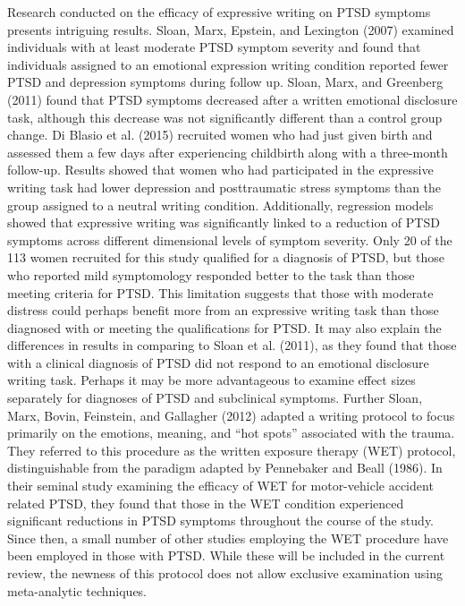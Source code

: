 \documentclass[man, mask]{apa6}
\theoremstyle{definition}
\theoremstyle{definition}
\theoremstyle{definition}
\theoremstyle{remark}
\begin{document}
Research conducted on the efficacy of expressive writing on PTSD
symptoms presents intriguing results. Sloan, Marx, Epstein, and
Lexington (2007) examined individuals with at least moderate PTSD
symptom severity and found that individuals assigned to an emotional
expression writing condition reported fewer PTSD and depression symptoms
during follow up. Sloan, Marx, and Greenberg (2011) found that PTSD
symptoms decreased after a written emotional disclosure task, although
this decrease was not significantly different than a control group
change. Di Blasio et al. (2015) recruited women who had just given birth
and assessed them a few days after experiencing childbirth along with a
three-month follow-up. Results showed that women who had participated in
the expressive writing task had lower depression and posttraumatic
stress symptoms than the group assigned to a neutral writing condition.
Additionally, regression models showed that expressive writing was
significantly linked to a reduction of PTSD symptoms across different
dimensional levels of symptom severity. Only 20 of the 113 women
recruited for this study qualified for a diagnosis of PTSD, but those
who reported mild symptomology responded better to the task than those
meeting criteria for PTSD. This limitation suggests that those with
moderate distress could perhaps benefit more from an expressive writing
task than those diagnosed with or meeting the qualifications for PTSD.
It may also explain the differences in results in comparing to Sloan et
al. (2011), as they found that those with a clinical diagnosis of PTSD
did not respond to an emotional disclosure writing task. Perhaps it may
be more advantageous to examine effect sizes separately for diagnoses of
PTSD and subclinical symptoms. Further Sloan, Marx, Bovin, Feinstein,
and Gallagher (2012) adapted a writing protocol to focus primarily on
the emotions, meaning, and \enquote{hot spots} associated with the
trauma. They referred to this procedure as the written exposure therapy
(WET) protocol, distinguishable from the paradigm adapted by Pennebaker
and Beall (1986). In their seminal study examining the efficacy of WET
for motor-vehicle accident related PTSD, they found that those in the
WET condition experienced significant reductions in PTSD symptoms
throughout the course of the study. Since then, a small number of other
studies employing the WET procedure have been employed in those with
PTSD. While these will be included in the current review, the newness of
this protocol does not allow exclusive examination using meta-analytic
techniques.
\end{document}
